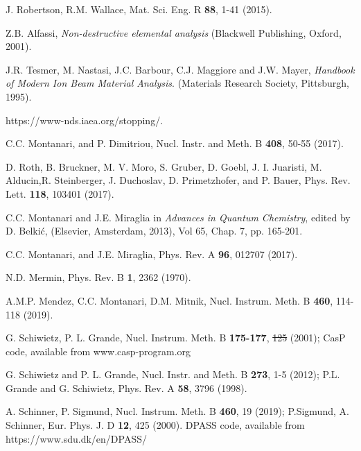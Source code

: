\documentclass[aps,pra,reprint,superscriptaddress]{revtex4-1}
\providecommand{\DIFadd}[1]{{\protect\color{blue}\uwave{#1}}} %
\providecommand{\DIFdel}[1]{{\protect\color{red}\sout{#1}}}                      %
\providecommand{\DIFaddbegin}{} %
\providecommand{\DIFaddend}{} %
\providecommand{\DIFdelbegin}{} %
\providecommand{\DIFdelend}{} %
\newcommand{\DIFscaledelfig}{0.5}
\newlength{\DIFdelgraphicswidth} %
\newlength{\DIFdelgraphicsheight} %
\newcommand{\DIFaddincludegraphics}[2][]{{\color{blue}\fbox{\DIFOincludegraphics[#1]{#2}}}} %
\newcommand{\DIFdelincludegraphics}[2][]{%
\sbox{\DIFdelgraphicsbox}{\DIFOincludegraphics[#1]{#2}}%
\settoboxwidth{\DIFdelgraphicswidth}{\DIFdelgraphicsbox} %
\settoboxtotalheight{\DIFdelgraphicsheight}{\DIFdelgraphicsbox} %
\scalebox{\DIFscaledelfig}{%
\parbox[b]{\DIFdelgraphicswidth}{\usebox{\DIFdelgraphicsbox}\\[-\baselineskip] \rule{\DIFdelgraphicswidth}{0em}}\llap{\resizebox{\DIFdelgraphicswidth}{\DIFdelgraphicsheight}{%
\setlength{\unitlength}{\DIFdelgraphicswidth}%
\begin{picture}(1,1)%
\thicklines\linethickness{2pt} %
{\color[rgb]{1,0,0}\put(0,0){\framebox(1,1){}}}%
{\color[rgb]{1,0,0}\put(0,0){\line( 1,1){1}}}%
{\color[rgb]{1,0,0}\put(0,1){\line(1,-1){1}}}%
\end{picture}%
}\hspace*{3pt}}} %
} %
\DeclareRobustCommand{\DIFaddbegin}{\DIFOaddbegin \let\includegraphics\DIFaddincludegraphics} %
\DeclareRobustCommand{\DIFaddend}{\DIFOaddend \let\includegraphics\DIFOincludegraphics} %
\DeclareRobustCommand{\DIFdelbegin}{\DIFOdelbegin \let\includegraphics\DIFdelincludegraphics} %
\DeclareRobustCommand{\DIFdelend}{\DIFOaddend \let\includegraphics\DIFOincludegraphics} %
\begin{document}
\begin{thebibliography}{00}
J. Robertson, R.M. Wallace, 
Mat. Sci. Eng. R \textbf{88}, 1-41 (2015).

Z.B. Alfassi,
\textit{Non-destructive elemental analysis}
(Blackwell Publishing, Oxford, 2001).

J.R. Tesmer, M. Nastasi, J.C. Barbour, C.J. Maggiore and J.W. Mayer,
\textit{Handbook of Modern Ion Beam Material Analysis}.
(Materials Research Society, Pittsburgh, 1995).

https://www-nds.iaea.org/stopping/.

C.C. Montanari, and P. Dimitriou, 
Nucl. Instr. and Meth. B \textbf{408},  50-55 (2017).

D. Roth, B. Bruckner, M. V. Moro, S. Gruber, D. Goebl, J. I. Juaristi, 
M. Alducin,R. Steinberger, J. Duchoslav, D. Primetzhofer, and P. Bauer, 
Phys. Rev. Lett. \textbf{118}, 103401 (2017).

C.C. Montanari and J.E. Miraglia in 
\textit{Advances in Quantum Chemistry}, 
edited by D. Belki\'c, (Elsevier, Amsterdam, 2013), Vol 65, Chap. 7, pp. 165-201. 

C.C. Montanari, and J.E. Miraglia, 
Phys. Rev. A \textbf{96}, 012707 (2017).

N.D. Mermin, 
Phys. Rev. B \textbf{1}, 2362 (1970).

A.M.P. Mendez, C.C. Montanari, D.M. Mitnik, 
Nucl. Instrum. Meth. B \textbf{460}, 114-118 (2019).

G. Schiwietz, P. L. Grande, 
Nucl. Instrum. Meth. B \textbf{175-177}, \DIFdelbegin \DIFdel{125 }\DIFdelend \DIFaddbegin \DIFadd{125-131 }\DIFaddend (2001); 
CasP code, available from www.casp-program.org

G. Schiwietz and P. L. Grande,
Nucl. Instr. and Meth. B \textbf{273}, 1-5 (2012); 
P.L. Grande and G. Schiwietz, 
Phys. Rev. A \textbf{58}, 3796 (1998).

A. Schinner, P. Sigmund, 
Nucl. Instrum. Meth. B \textbf{460}, 19 (2019); 
P.Sigmund, A. Schinner, 
Eur. Phys. J. D \textbf{12}, 425 (2000). 
DPASS code, available from https://www.sdu.dk/en/DPASS/


\end{thebibliography}
\end{document}
